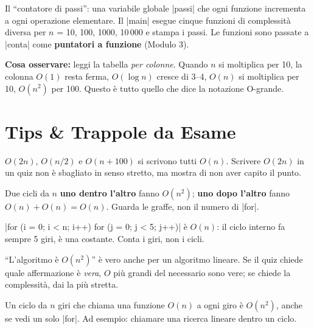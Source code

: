 Il ``contatore di passi'': una variabile globale \cc|passi| che ogni funzione
incrementa a ogni operazione elementare. Il \cc|main| esegue cinque funzioni di
complessità diversa per $n$ = 10, 100, 1000, 10\,000 e stampa i passi. Le funzioni
sono passate a \cc|conta| come \textbf{puntatori a funzione} (Modulo 3).


\textbf{Cosa osservare:} leggi la tabella \emph{per colonne}. Quando $n$ si
moltiplica per 10, la colonna $O(1)$ resta ferma, $O(\log n)$ cresce di 3--4,
$O(n)$ si moltiplica per 10, $O(n^2)$ per 100. Questo è tutto quello che dice la
notazione O-grande.

\section{Tips \& Trappole da Esame}

\begin{trappola}
$O(2n)$, $O(n/2)$ e $O(n + 100)$ si scrivono tutti $O(n)$. Scrivere $O(2n)$ in un
quiz non è sbagliato in senso stretto, ma mostra di non aver capito il punto.
\end{trappola}

\begin{trappola}
Due cicli da $n$ \textbf{uno dentro l'altro} fanno $O(n^2)$; \textbf{uno dopo
l'altro} fanno $O(n) + O(n) = O(n)$. Guarda le graffe, non il numero di \cc|for|.
\end{trappola}

\begin{trappola}
\cc|for (i = 0; i < n; i++) for (j = 0; j < 5; j++)| è $O(n)$: il ciclo interno fa
sempre 5 giri, è una costante. Conta i giri, non i cicli.
\end{trappola}

\begin{trappola}
``L'algoritmo è $O(n^2)$'' è vero anche per un algoritmo lineare. Se il quiz chiede
quale affermazione è \emph{vera}, $O$ più grandi del necessario sono vere; se chiede
la complessità, dai la più stretta.
\end{trappola}

\begin{trappola}
Un ciclo da $n$ giri che chiama una funzione $O(n)$ a ogni giro è $O(n^2)$, anche se
vedi un solo \cc|for|. Ad esempio: chiamare una ricerca lineare dentro un ciclo.
\end{trappola}

